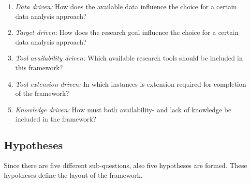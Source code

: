\documentclass[10pt,a4paper]{article}
\begin{document}
	\begin{enumerate}

	\item[] \textit{Data driven:} How does the available data influence the choice for a certain data analysis approach?
	
	\item[] \textit{Target driven:} How does the research goal influence the choice for a certain data analysis approach?
	
	\item[] \textit{Tool availability driven:} Which available research tools should be included in this framework?
	
	\item[] \textit{Tool extension driven:} In which instances is extension required for completion of the framework?
	
	\item[] \textit{Knowledge driven:} How must both availability- and lack of knowledge be included in the framework?
	
	\end{enumerate}
	
	\subsection{Hypotheses}
	\label{subsec:Hypotheses}
	
	Since there are five different sub-questions, also five hypotheses are formed. These hypotheses define the layout of the framework.
	
\end{document}
